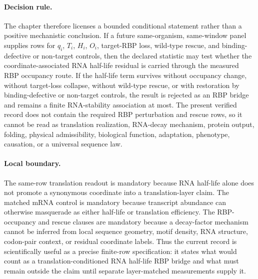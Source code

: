 \paragraph{Decision rule.}
The chapter therefore licenses a bounded conditional statement rather than a positive mechanistic conclusion. If a future same-organism, same-window panel supplies rows for $q_i$, $T_i$, $H_i$, $O_i$, target-RBP loss, wild-type rescue, and binding-defective or non-target controls, then the declared statistic may test whether the coordinate-associated RNA half-life residual is carried through the measured RBP occupancy route. If the half-life term survives without occupancy change, without target-loss collapse, without wild-type rescue, or with restoration by binding-defective or non-target controls, the result is rejected as an RBP bridge and remains a finite RNA-stability association at most. The present verified record does not contain the required RBP perturbation and rescue rows, so it cannot be read as translation realization, RNA-decay mechanism, protein output, folding, physical admissibility, biological function, adaptation, phenotype, causation, or a universal sequence law.

\paragraph{Local boundary.}
The same-row translation readout is mandatory because RNA half-life alone does not promote a synonymous coordinate into a translation-layer claim. The matched mRNA control is mandatory because transcript abundance can otherwise masquerade as either half-life or translation efficiency. The RBP-occupancy and rescue clauses are mandatory because a decay-factor mechanism cannot be inferred from local sequence geometry, motif density, RNA structure, codon-pair context, or residual coordinate labels. Thus the current record is scientifically useful as a precise finite-row specification: it states what would count as a translation-conditioned RNA half-life RBP bridge and what must remain outside the claim until separate layer-matched measurements supply it.